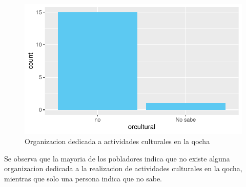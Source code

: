 \documentclass[12pt]{article}\usepackage[]{graphicx}\usepackage[]{xcolor}
\makeatletter
\def\maxwidth{ %
  \ifdim\Gin@nat@width>\linewidth
    \linewidth
  \else
    \Gin@nat@width
  \fi
}
\newenvironment{knitrout}{}{} %
\makeatother
\begin{document}
	\begin{figure}[H]
	\centering
\begin{knitrout}
\color{fgcolor}
\includegraphics[width=\maxwidth]{figure/veintidos-1} 
\end{knitrout}
	\caption{Organizacion dedicada a actividades culturales en la qocha}
	\end{figure}
	Se observa que la mayoria de los pobladores indica que no existe alguna organizacion dedicada a la realizacion de actividades culturales en la qocha, mientras que solo una persona indica que no sabe.  
\end{document}
